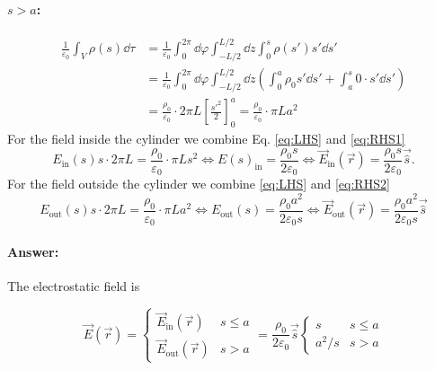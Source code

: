 \paragraph{$s > a$:}
\begin{align}
    \frac{1}{\varepsilon_0} \int_{V} \rho(s) \dd \tau &= \frac{1}{\varepsilon_0} \int_{0}^{2\pi}\dd \varphi \int_{-L/2}^{L/2} \dd z \int_{0}^{s} \rho(s') s' \dd s'\\
    &= \frac{1}{\varepsilon_0} \int_{0}^{2\pi}\dd \varphi \int_{-L/2}^{L/2} \dd z \left( \int_{0}^{a} \rho_0 s' \dd s' + \int_{a}^{s} 0 \cdot s' \dd s' \right)\\
    &= \frac{\rho_0}{\varepsilon_0} \cdot 2 \pi L \left[\frac{s'^2}{2}\right]_0^a = \frac{\rho_0}{\varepsilon_0} \cdot \pi L a^2\label{eq:RHS2}
\end{align}
For the field inside the cylinder we combine Eq. \eqref{eq:LHS} and \eqref{eq:RHS1}
\begin{equation}
    E_\text{in}(s)s \cdot 2\pi L = \frac{\rho_0}{\varepsilon_0}\cdot \pi L s^2 \iff E(s)_\text{in} = \frac{\rho_0 s}{2 \varepsilon_0}  \iff \vec{E}_\text{in}(\vec{r}) = \frac{\rho_0 s}{2 \varepsilon_0} \vec{\hat{s}}.
\end{equation}
For the field outside the cylinder we combine \eqref{eq:LHS} and \eqref{eq:RHS2}
\begin{equation}
    E_\text{out}(s)s \cdot 2\pi L = \frac{\rho_0}{\varepsilon_0} \cdot \pi L a^2 \iff E_\text{out}(s) = \frac{\rho_0 a^2}{2 \varepsilon_0 s} \iff \vec{E}_\text{out} (\vec{r}) = \frac{\rho_0 a^2}{2 \varepsilon_0 s} \vec{\hat{s}}
\end{equation}

\newpage
\paragraph{Answer:} The electrostatic field is
\begin{singlespace}
\begin{equation}
    \vec{E}(\vec{r}) = 
    \begin{cases}
        \vec{E}_\text{in}(\vec{r}) & s \leq a\\
        \vec{E}_\text{out} (\vec{r}) & s > a
    \end{cases}
    = \frac{\rho_0}{2 \varepsilon_0} \vec{\hat{s}} 
    \begin{cases}
        s & s \leq a\\
        a^2/s & s > a
    \end{cases}
\end{equation}
\end{singlespace} 